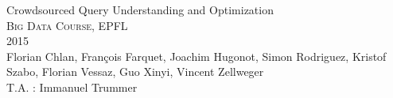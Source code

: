 \begin{titlepage}
 \vspace*{\fill}
\begin{center}
\begin{spacing}{2.0}

{\huge Crowdsourced Query Understanding and Optimization}
\\[1.5cm]

\textsc{ \Large Big Data Course, EPFL \\ 2015}
\\[1.5cm]

{\Large Florian Chlan, François Farquet, Joachim Hugonot, Simon Rodriguez, Kristof Szabo, Florian Vessaz, Guo Xinyi, Vincent Zellweger}
\\[0.5cm]

{\large T.A. : Immanuel Trummer}

\end{spacing}
\end{center}
\vspace*{\fill}
\end{titlepage}